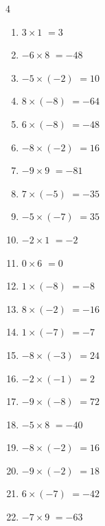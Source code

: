 \begin{multicols}{4}
\begin{enumerate}
  \item $3\times 1$
        $=3$

  \item $-6\times 8$
        $=-48$

  \item $-5\times (-2)$
        $=10$

  \item $8\times (-8)$
        $=-64$

  \item $6\times (-8)$
        $=-48$

  \item $-8\times (-2)$
        $=16$

  \item $-9\times 9$
        $=-81$

  \item $7\times (-5)$
        $=-35$

  \item $-5\times (-7)$
        $=35$

  \item $-2\times 1$
        $=-2$

  \item $0\times 6$
        $=0$

  \item $1\times (-8)$
        $=-8$

  \item $8\times (-2)$
        $=-16$

  \item $1\times (-7)$
        $=-7$

\columnbreak %

  \item $-8\times (-3)$
        $=24$

  \item $-2\times (-1)$
        $=2$

  \item $-9\times (-8)$
        $=72$

  \item $-5\times 8$
        $=-40$

  \item $-8\times (-2)$
        $=16$

  \item $-9\times (-2)$
        $=18$

  \item $6\times (-7)$
        $=-42$

  \item $-7\times 9$
        $=-63$


\end{enumerate}
\end{multicols}
